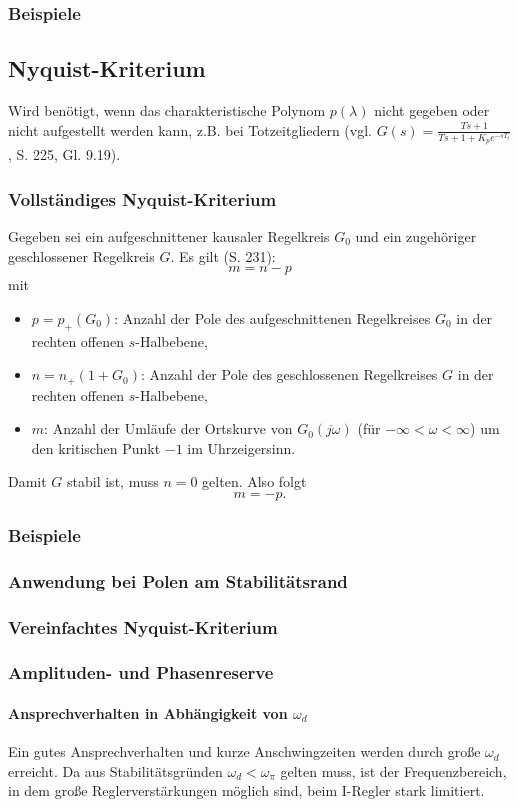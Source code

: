 \documentclass[12pt]{article}
\begin{document}
\subsubsection{Beispiele}
\subsection{Nyquist-Kriterium}
Wird benötigt, wenn das charakteristische Polynom \(p(\lambda)\) nicht gegeben oder nicht aufgestellt werden kann, z.B. bei Totzeitgliedern (vgl. \(G(s)=\frac{T s+1}{T s+1+K_p e^{-sT_t}}\), S. 225, Gl. 9.19).
\subsubsection{Vollständiges Nyquist-Kriterium}
Gegeben sei ein aufgeschnittener kausaler\footnotemark{} Regelkreis \(G_0\) und ein zugehöriger geschlossener Regelkreis \(G\).
Es gilt (S. 231):
\[
m = n - p
\]
mit
\begin{itemize}
    \item \(p = p_+(G_0)\): Anzahl der Pole des aufgeschnittenen Regelkreises \(G_0\) in der rechten offenen \(s\)-Halbebene,
    \item \(n = n_+(1+G_0)\): Anzahl der Pole des geschlossenen Regelkreises \(G\) in der rechten offenen \(s\)-Halbebene,
    \item \(m\): Anzahl der Umläufe der Ortskurve von \(G_0(j\omega)\) (für \(-\infty<\omega<\infty\)) um den kritischen Punkt \(-1\) im Uhrzeigersinn.
\end{itemize}
Damit \(G\) stabil ist, muss \(n=0\) gelten. Also folgt
\[
m=-p.
\]
\subsubsection{Beispiele}
\subsubsection{Anwendung bei Polen am Stabilitätsrand}
\subsubsection{Vereinfachtes Nyquist-Kriterium}


\subsubsection{Amplituden- und Phasenreserve}
\paragraph{Ansprechverhalten in Abhängigkeit von \(\omega_d\)}
Ein gutes Ansprechverhalten und kurze Anschwingzeiten werden durch große \(\omega_d\) erreicht. Da aus Stabilitätsgründen \(\omega_d < \omega_{\pi}\) gelten muss, ist der Frequenzbereich, in dem große Reglerverstärkungen möglich sind, beim I-Regler stark limitiert.
\end{document}
